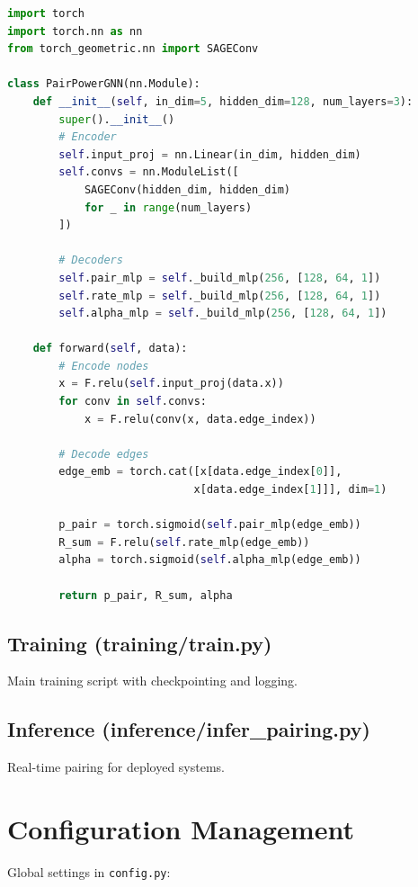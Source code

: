 \begin{lstlisting}[language=Python, caption={Model Class Skeleton}]
import torch
import torch.nn as nn
from torch_geometric.nn import SAGEConv

class PairPowerGNN(nn.Module):
    def __init__(self, in_dim=5, hidden_dim=128, num_layers=3):
        super().__init__()
        # Encoder
        self.input_proj = nn.Linear(in_dim, hidden_dim)
        self.convs = nn.ModuleList([
            SAGEConv(hidden_dim, hidden_dim) 
            for _ in range(num_layers)
        ])
        
        # Decoders
        self.pair_mlp = self._build_mlp(256, [128, 64, 1])
        self.rate_mlp = self._build_mlp(256, [128, 64, 1])
        self.alpha_mlp = self._build_mlp(256, [128, 64, 1])
    
    def forward(self, data):
        # Encode nodes
        x = F.relu(self.input_proj(data.x))
        for conv in self.convs:
            x = F.relu(conv(x, data.edge_index))
        
        # Decode edges
        edge_emb = torch.cat([x[data.edge_index[0]], 
                             x[data.edge_index[1]]], dim=1)
        
        p_pair = torch.sigmoid(self.pair_mlp(edge_emb))
        R_sum = F.relu(self.rate_mlp(edge_emb))
        alpha = torch.sigmoid(self.alpha_mlp(edge_emb))
        
        return p_pair, R_sum, alpha
\end{lstlisting}

\subsection{Training (training/train.py)}

Main training script with checkpointing and logging.

\subsection{Inference (inference/infer_pairing.py)}

Real-time pairing for deployed systems.

\section{Configuration Management}

Global settings in \texttt{config.py}:

